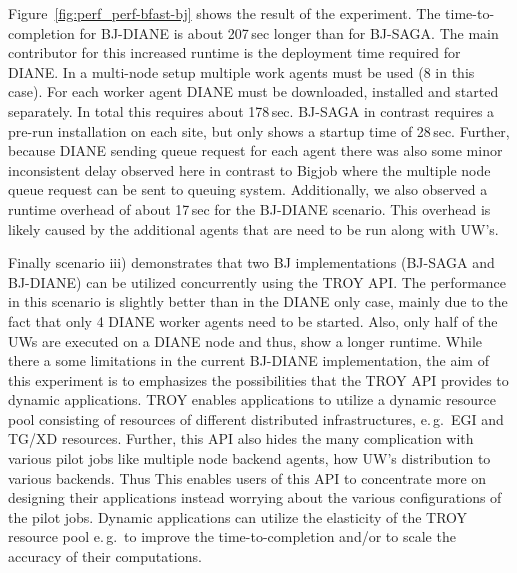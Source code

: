 \documentclass[conference,final]{IEEEtran}
\begin{document}
Figure~\ref{fig:perf_perf-bfast-bj} shows the result of the experiment. The
time-to-completion for BJ-DIANE is about 207\,sec longer than for BJ-SAGA. The
main contributor for this increased runtime is the deployment time required for
DIANE. In a multi-node setup multiple work agents must be used (8 in this case).
For each worker agent DIANE must be downloaded, installed and started
separately. In total this requires about 178\,sec. BJ-SAGA in contrast requires
a pre-run installation on each site, but only shows a startup time of 28\,sec.
Further, because DIANE sending queue request for each agent
there was also some minor inconsistent delay observed here in contrast to Bigjob where the multiple
node queue request can be sent to queuing system. 
Additionally, we also observed a runtime overhead of about 17\,sec for the BJ-DIANE
scenario. This overhead is likely caused by the additional agents that are need to
be run along with UW's. 



Finally scenario iii) demonstrates that two BJ implementations (BJ-SAGA and
BJ-DIANE) can be utilized concurrently using the TROY API. The performance in
this scenario is slightly better than in the DIANE only case, mainly due to
the fact that only 4 DIANE worker agents need to be started. Also, only half of
the UWs are executed on a DIANE node and thus, show a longer runtime. While
there a some limitations in the current BJ-DIANE implementation, the aim of this
experiment is to emphasizes the possibilities that the TROY API provides to
dynamic applications. TROY enables applications to utilize a dynamic resource
pool consisting of resources of different distributed infrastructures, e.\,g.\
EGI and TG/XD resources.  Further, this API also hides the many complication with various pilot jobs
like multiple node backend agents, how UW's distribution to various backends. Thus
This enables users of this API to concentrate more on designing their applications 
instead worrying about the various  configurations of the pilot jobs. 
Dynamic applications can utilize the elasticity of the
TROY resource pool e.\,g.\ to improve the time-to-completion and/or to scale the
accuracy of their computations.
\end{document}

